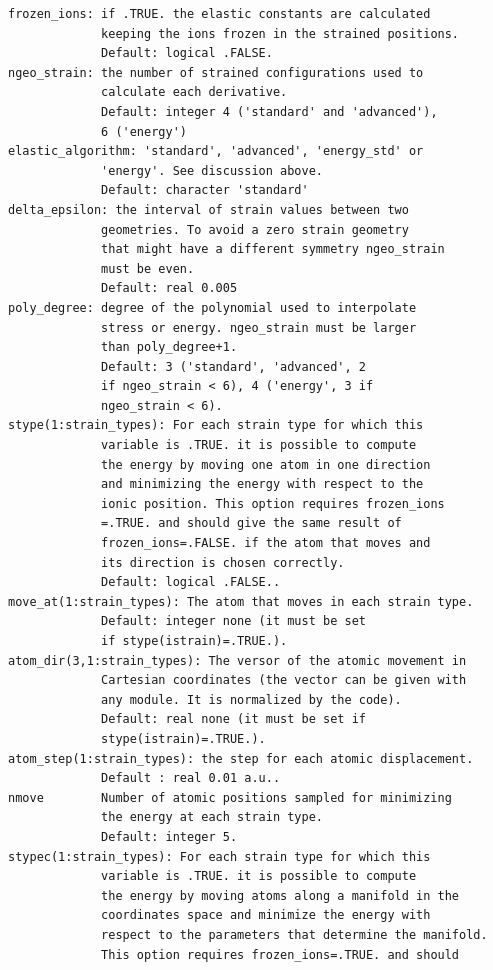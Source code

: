 \documentclass[12pt,a4paper,twoside]{report}
\begin{document}
\begin{verbatim}
frozen_ions: if .TRUE. the elastic constants are calculated 
             keeping the ions frozen in the strained positions. 
             Default: logical .FALSE.
ngeo_strain: the number of strained configurations used to 
             calculate each derivative. 
             Default: integer 4 ('standard' and 'advanced'), 
             6 ('energy')
elastic_algorithm: 'standard', 'advanced', 'energy_std' or 
             'energy'. See discussion above.
             Default: character 'standard' 
delta_epsilon: the interval of strain values between two 
             geometries. To avoid a zero strain geometry 
             that might have a different symmetry ngeo_strain 
             must be even.
             Default: real 0.005
poly_degree: degree of the polynomial used to interpolate 
             stress or energy. ngeo_strain must be larger 
             than poly_degree+1.
             Default: 3 ('standard', 'advanced', 2 
             if ngeo_strain < 6), 4 ('energy', 3 if 
             ngeo_strain < 6).
stype(1:strain_types): For each strain type for which this 
             variable is .TRUE. it is possible to compute 
             the energy by moving one atom in one direction 
             and minimizing the energy with respect to the
             ionic position. This option requires frozen_ions
             =.TRUE. and should give the same result of 
             frozen_ions=.FALSE. if the atom that moves and 
             its direction is chosen correctly.
             Default: logical .FALSE..
move_at(1:strain_types): The atom that moves in each strain type.
             Default: integer none (it must be set 
             if stype(istrain)=.TRUE.).
atom_dir(3,1:strain_types): The versor of the atomic movement in
             Cartesian coordinates (the vector can be given with 
             any module. It is normalized by the code).
             Default: real none (it must be set if 
             stype(istrain)=.TRUE.).
atom_step(1:strain_types): the step for each atomic displacement.
             Default : real 0.01 a.u..
nmove        Number of atomic positions sampled for minimizing 
             the energy at each strain type.
             Default: integer 5.
stypec(1:strain_types): For each strain type for which this 
             variable is .TRUE. it is possible to compute 
             the energy by moving atoms along a manifold in the 
             coordinates space and minimize the energy with 
             respect to the parameters that determine the manifold. 
             This option requires frozen_ions=.TRUE. and should 

\end{verbatim}
\end{document}
